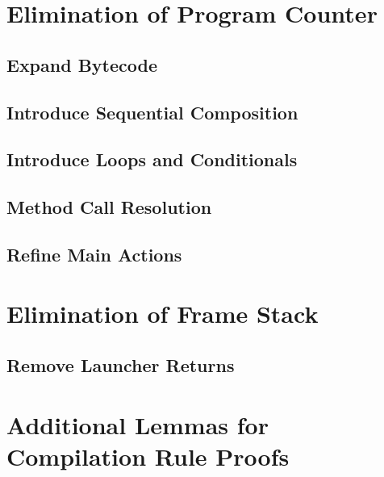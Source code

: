 \section{Elimination of Program Counter}

\subsection{Expand Bytecode}



\pagebreak

\subsection{Introduce Sequential Composition}



\pagebreak

\subsection{Introduce Loops and Conditionals}



\pagebreak

\subsection{Method Call Resolution}



\pagebreak

\subsection{Refine Main Actions}



\pagebreak

\section{Elimination of Frame Stack}

\subsection{Remove Launcher Returns}



\pagebreak

\section{Additional Lemmas for Compilation Rule Proofs}

